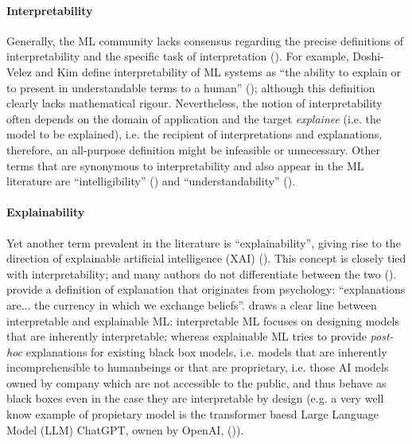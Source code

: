 \documentclass[binding=0.6cm]{sapthesis}
\newcommand{\mycite}[1]{(\cite{#1})}
\begin{document}
\paragraph{Interpretability}
\label{sec:bg.xai.interpretable}
Generally, the ML community lacks consensus regarding the precise definitions of interpretability and the specific task of interpretation \mycite{doshivelez2017-rigorous}. For example, Doshi-Velez and Kim define interpretability of ML systems as “the ability to explain or to present in understandable terms to a human” \mycite{lipton2017-mythos}; although this definition clearly lacks mathematical rigour. Nevertheless, the notion of interpretability often depends on the domain of application and the target \textit{explainee} (i.e. the model to be explained), i.e. the recipient of interpretations and explanations, therefore, an all-purpose definition might be infeasible or unnecessary. Other terms that are synonymous to interpretability and also appear in the ML literature are “intelligibility” \mycite{vilone2021-xai-notions,caruana2015-xai-heatlhcare} and “understandability” \mycite{lipton2017-mythos}. 

\paragraph{Explainability}
\label{sec:bg.xai.explainable}
Yet another term prevalent in the literature is “explainability”, giving rise to the direction of explainable artificial intelligence (XAI) \mycite{turek2021-darpa}. This concept is closely tied with interpretability; and many authors do not differentiate between the two \mycite{carvalho2019-interpr}. \cite{doshivelez2017-rigorous} provide a definition of explanation that originates from psychology: “explanations are... the currency in which we exchange beliefs”. \cite{rudin2019-stop-epxlaining-black-box} draws a clear line between interpretable and explainable ML: interpretable ML focuses on designing models that are inherently interpretable; whereas explainable ML tries to provide \textit{post-hoc} explanations for existing black box models, i.e. models that are inherently incomprehensible to humanbeings or that are proprietary, i.e. those AI models owned by company which are not accessible to the public, and thus behave as black boxes even in the case they are interpretable by design (e.g. a very well know example of propietary model is the transformer baesd Large Language Model (LLM) ChatGPT, ownen by OpenAI, \mycite{brown2020-gpt3}). 
\end{document}

